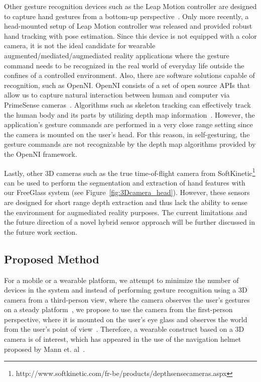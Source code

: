Other gesture recognition devices such as the Leap Motion controller are
designed to capture hand gestures from a bottom-up perspective~\cite{leapmotion}. Only more recently, a head-mounted setup of Leap Motion controller was released and provided robust hand tracking with pose estimation. Since this device is not equipped with a color camera, it is not the ideal candidate for wearable augmented/mediated/augmediated reality applications where the gesture command needs to be recognized in the real world of everyday life outside the confines of a controlled environment. Also, there are software
solutions capable of recognition, such as OpenNI. OpenNI consists of a set of
open source APIs that allow us to capture natural interaction between human
and computer via PrimeSense cameras~\cite{openniabout}. Algorithms such as
skeleton tracking can effectively track the human body and its parts
by utilizing depth map information~\cite{primesensenite2}. However,
the application's gesture commands are performed in a very close range setting since the camera
is mounted on the user's head. For this reason, in self-gesturing, the gesture commands are not
recognizable by the depth map algorithms provided by the OpenNI framework.

Lastly, other 3D cameras such as the true time-of-flight camera
from SoftKinetic\footnote{http://www.softkinetic.com/fr-be/products/depthsensecameras.aspx} can
be used to perform the segmentation and extraction of hand features with our
FreeGlass system (see Figure~\ref{fig:3Dcamera_head}). However, these
sensors are designed for short range depth extraction and thus lack the ability
to sense the environment for augmediated reality purposes. The current
limitations and the future direction of a novel hybrid sensor approach will
be further discussed in the future work section.

\subsection{Proposed Method}
For a mobile or a wearable platform, we attempt to minimize the number of
devices in the system and instead of performing gesture recognition
using a 3D camera from a third-person view, where the camera observes the
user's gestures on a steady platform~\cite{li2009real}, we propose to use
the camera from the first-person perspective, where it is mounted on the
user's eye glass and observes the world from the user's point of
view~\cite{mann2011blind}. Therefore, a wearable construct based on
a 3D camera is of interest, which has appeared in the use of the navigation
helmet proposed by Mann et. al~\cite{mann2011blind}.

